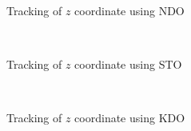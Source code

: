 \documentclass[letterpaper%
, twoside%
, 12pt%
,memoire%
, english%
,creativecommons,hyperref%
]{thETS}
\theoremstyle{newThmStyle}
\begin{document}
\begin{figure}[H]
\centering
{}
\\ \parbox{0.75\textwidth}{\caption{Tracking of $z$ coordinate using NDO}
\label{z_trac_dis_m1_ndo}}
\end{figure}

\begin{figure}[H]
\centering
{}
\\ \parbox{0.75\textwidth}{\caption{Tracking of $z$ coordinate using STO}
\label{z_trac_dis_m1_sto}}
\end{figure}

\begin{figure}[H]
\centering
{}
\\ \parbox{0.75\textwidth}{\caption{Tracking of $z$ coordinate using KDO}
\label{z_trac_dis_m1_kdo}}
\end{figure}
\end{document}
